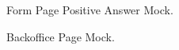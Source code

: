 \begin{figure}[H]
	\begin{center}
	\end{center}
	\caption{Form Page Positive Answer Mock.}\label{fig:form_yes}
\end{figure}

\begin{figure}[H]
	\begin{center}
	\end{center}
	\caption{Backoffice Page Mock.}\label{fig:backoffice}
\end{figure}




%
%
